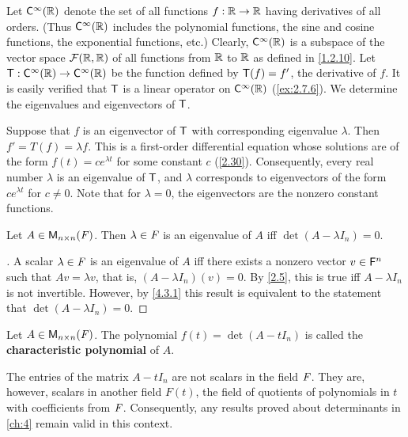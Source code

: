 \begin{eg}\label{5.1.4}
	Let \(\cfs[\infty](\R)\) denote the set of all functions \(f : \mathbb{R} \to \mathbb{R}\) having derivatives of all orders.
	(Thus \(\cfs[\infty](\R)\) includes the polynomial functions, the sine and cosine functions, the exponential functions, etc.)
	Clearly, \(\cfs[\infty](\R)\) is a subspace of the vector space \(\mathcal{F}(\mathbb{R}, \mathbb{R})\) of all functions from \(\mathbb{R}\) to \(\mathbb{R}\) as defined in \cref{1.2.10}.
	Let \(\T : \cfs[\infty](\R) \to \cfs[\infty](\R)\) be the function defined by \(\mathsf{T}(f) = f'\), the derivative of \(f\).
	It is easily verified that \(\mathsf{T}\) is a linear operator on \(\cfs[\infty](\R)\) (\cref{ex:2.7.6}).
	We determine the eigenvalues and eigenvectors of \(\mathsf{T}\).

	Suppose that \(f\) is an eigenvector of \(\mathsf{T}\) with corresponding eigenvalue \(\lambda\).
	Then \(f' = T(f) = \lambda f\).
	This is a first-order differential equation whose solutions are of the form \(f(t) = ce^{\lambda t}\) for some constant \(c\) (\cref{2.30}).
	Consequently, every real number \(\lambda\) is an eigenvalue of \(\mathsf{T}\), and \(\lambda\) corresponds to eigenvectors of the form \(ce^{\lambda t}\) for \(c \neq 0\).
	Note that for \(\lambda = 0\), the eigenvectors are the nonzero constant functions.
\end{eg}

\begin{thm}\label{5.2}
	Let \(A \in \mathsf{M}_{{n} \times n}({\mathit{F}})\).
	Then \(\lambda \in \mathit{F}\) is an eigenvalue of \(A\) iff \(\det(A - \lambda I_n) = 0\).
\end{thm}

\begin{proof}[]
	A scalar \(\lambda \in \mathit{F}\) is an eigenvalue of \(A\) iff there exists a nonzero vector \(v \in \mathsf{F}^n\) such that \(Av = \lambda v\), that is, \((A - \lambda I_n)(v) = 0\).
	By \cref{2.5}, this is true iff \(A - \lambda I_n\) is not invertible.
	However, by \cref{4.3.1} this result is equivalent to the statement that \(\det(A - \lambda I_n) = 0\).
\end{proof}

\begin{defn}\label{5.1.5}
	Let \(A \in \mathsf{M}_{{n} \times n}({\mathit{F}})\).
	The polynomial \(f(t) = \det(A - t I_n)\) is called the \textbf{characteristic polynomial} of \(A\).
\end{defn}

\begin{note}
	The entries of the matrix \(A - t I_n\) are not scalars in the field \(\mathit{F}\).
	They are, however, scalars in another field \(F(t)\), the field of quotients of polynomials in \(t\) with coefficients from \(\mathit{F}\).
	Consequently, any results proved about determinants in \cref{ch:4} remain valid in this context.
\end{note}

